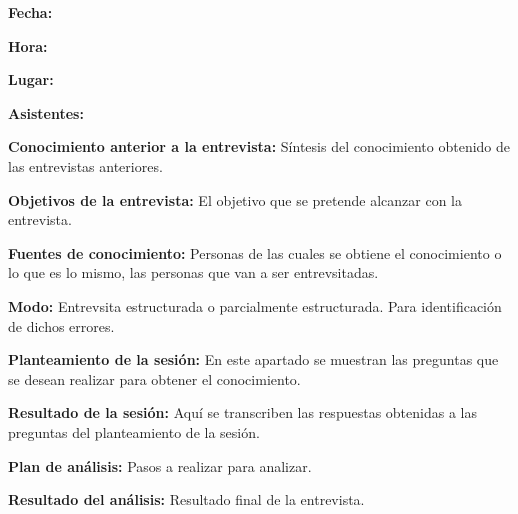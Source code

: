 \textbf{Fecha:}

\textbf{Hora:}

\textbf{Lugar:}

\textbf{Asistentes:}

\textbf{Conocimiento anterior a la entrevista:} Síntesis del conocimiento obtenido
 de las entrevistas anteriores.

\textbf{Objetivos de la entrevista:} El objetivo que se pretende alcanzar con la entrevista.

\textbf{Fuentes de conocimiento:} Personas de las cuales se obtiene el conocimiento o
 lo que es lo mismo, las personas que van a ser entrevsitadas.

\textbf{Modo:} Entrevsita estructurada o parcialmente estructurada. Para identificación de
 dichos errores.

\textbf{Planteamiento de la sesión:} En este apartado se muestran las preguntas que se desean
 realizar para obtener el conocimiento.

\textbf{Resultado de la sesión:} Aquí se transcriben las respuestas obtenidas a las preguntas
 del planteamiento de la sesión.

\textbf{Plan de análisis:} Pasos a realizar para analizar.

\textbf{Resultado del análisis:} Resultado final de la entrevista.


